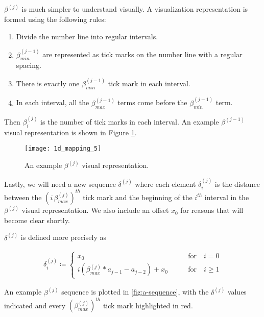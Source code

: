 $\beta^{(j)}$ is much simpler to understand visually. A visualization representation is formed using the following rules:

\begin{enumerate}
  \item Divide the number line into regular intervals.
  \item $\beta^{(j-1)}_{min}$ are represented as tick marks on the number line with a regular spacing.
	\item There is exactly one $\beta^{(j-1)}_{min}$ tick mark in each interval.
	\item In each interval, all the $\beta^{(j-1)}_{max}$ terms come before the $\beta^{(j-1)}_{min}$ term.
\end{enumerate}

Then $\beta^{(j)}_i$ is the number of tick marks in each interval. An example $\beta^{(j-1)}$ visual representation is shown in Figure \ref{fig:beta-sequence-j}.

\begin{figure}[H]
  \begin{center}
    \texttt{[image: 1d\_mapping\_5]}
  \end{center}
  \vspace{-.2in} %
  \caption{\label{fig:beta-sequence-j} An example $\beta^{(j)}$ visual representation.}
\end{figure}

Lastly, we will need a new sequence $\delta^{(j)}$ where each element $\delta^{(j)}_i$ is the distance between the $(i \, \beta^{(j)}_{max})^{th}$ tick mark and the beginning of the $i^{th}$ interval in the $\beta^{(j)}$ visual representation. We also include an offset $x_0$ for reasons that will become clear shortly.

\begin{definition}
  $\delta^{(j)}$ is defined more precisely as

  \begin{align}\label{delta_beta}
    \delta^{(j)}_i \coloneqq \begin{cases}
      x_0 \qquad &\text{for} \quad i = 0\\
      i (\beta^{(j)}_{max} * a_{j-1} - a_{j-2}) + x_0 \qquad &\text{for} \quad i \ge 1
    \end{cases}
  \end{align}
\end{definition}

An example $\beta^{(j)}$ sequence is plotted in \ref{fig:a-sequence}, with the $\delta^{(j)}$ values indicated and every $(\beta^{(j)}_{max})^{th}$ tick mark highlighted in red.

